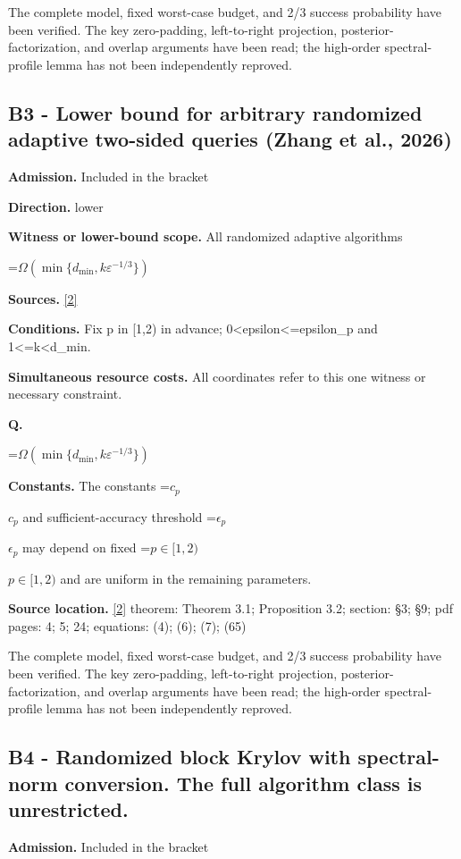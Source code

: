 \documentclass[10pt,a4paper]{article}
\newcommand{\AtlasMath}[1]{\par\begingroup\centering\setbox0=\hbox{$\displaystyle #1$}\ifdim\wd0>1.4\linewidth\typeout{ATLAS WIDE FORMULA: \the\wd0}\fi\ifdim\wd0>\linewidth\resizebox{\linewidth}{!}{\box0}\else\box0\fi\par\endgroup}
\newcommand{\AtlasInlineMath}[1]{\begingroup\setbox0=\hbox{$#1$}\ifdim\wd0>.4\linewidth\endgroup\AtlasMath{#1}\else\endgroup$#1$\fi}
\begin{document}
The complete model, fixed worst-case budget, and 2/3 success probability have been verified. The key zero-padding, left-to-right projection, posterior-factorization, and overlap arguments have been read; the high-order spectral-profile lemma has not been independently reproved.

\subsection{B3 - Lower bound for arbitrary randomized adaptive two-sided queries (Zhang et al., 2026)}
\textbf{Admission.} Included in the bracket

\textbf{Direction.} lower

\textbf{Witness or lower-bound scope.} All randomized adaptive algorithms

\AtlasMath{\Omega(\min\{d_{\mathrm{min}},k\varepsilon^{-1/3}\})}
\textbf{Sources.} \href{https://arxiv.org/pdf/2609.35840v2}{[2]}

\textbf{Conditions.} Fix p in [1,2) in advance; 0<epsilon<=epsilon\_p and 1<=k<d\_min.

\textbf{Simultaneous resource costs.} All coordinates refer to this one witness or necessary constraint.

\textbf{Q.}

\AtlasMath{\Omega(\min\{d_{\mathrm{min}},k\varepsilon^{-1/3}\})}
\textbf{Constants.} The constants \AtlasInlineMath{c_p} and sufficient-accuracy threshold \AtlasInlineMath{\epsilon_p} may depend on fixed \AtlasInlineMath{p\in[1,2)} and are uniform in the remaining parameters.

\textbf{Source location.} \href{https://arxiv.org/pdf/2609.35840v2}{[2]} theorem: Theorem 3.1; Proposition 3.2; section: §3; §9; pdf pages: 4; 5; 24; equations: (4); (6); (7); (65)

The complete model, fixed worst-case budget, and 2/3 success probability have been verified. The key zero-padding, left-to-right projection, posterior-factorization, and overlap arguments have been read; the high-order spectral-profile lemma has not been independently reproved.

\subsection{B4 - Randomized block Krylov with spectral-norm conversion. The full algorithm class is unrestricted.}
\textbf{Admission.} Included in the bracket
\end{document}
